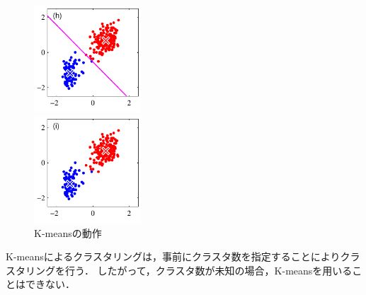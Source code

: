 \begin{figure}[htbp]
\begin{minipage}{0.33\hsize}
\begin{center}
    \end{center}
  \end{minipage}
  \begin{minipage}{0.33\hsize}
    \begin{center}
      \includegraphics[width=40mm]{img/kmeans/Figure91h.pdf}
    \end{center}
  \end{minipage}
  \begin{minipage}{0.33\hsize}
    \begin{center}
      \includegraphics[width=40mm]{img/kmeans/Figure91i.pdf}
    \end{center}
  \end{minipage}
  \caption{K-meansの動作}
  \label{fig:k-means}
\end{figure}

K-meansによるクラスタリングは，事前にクラスタ数を指定することによりクラスタリングを行う．
したがって，クラスタ数が未知の場合，K-meansを用いることはできない．

